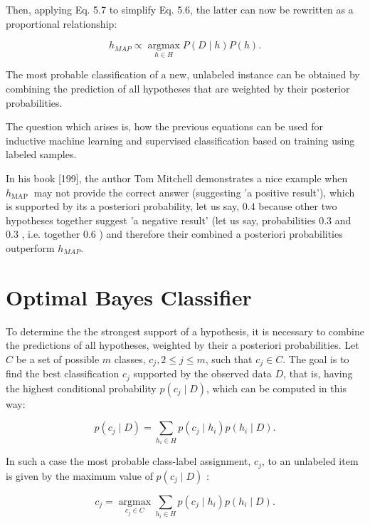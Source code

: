\documentclass[11pt,openany,executivepaper]{book}
\begin{document}
Then, applying Eq. 5.7 to simplify Eq. 5.6, the latter can now be rewritten as a proportional relationship:


\begin{equation*}
h_{M A P} \propto \underset{h \in H}{\operatorname{argmax}} P(D \mid h) P(h) . \tag{5.8}
\end{equation*}


The most probable classification of a new, unlabeled instance can be obtained by combining the prediction of all hypotheses that are weighted by their posterior probabilities.

The question which arises is, how the previous equations can be used for inductive machine learning and supervised classification based on training using labeled samples.

In his book [199], the author Tom Mitchell demonstrates a nice example when $h_{\text {MAP }}$ may not provide the correct answer (suggesting 'a positive result'), which is supported by its a posteriori probability, let us say, 0.4 because other two hypotheses together suggest 'a negative result' (let us say, probabilities 0.3 and 0.3 , i.e. together 0.6 ) and therefore their combined a posteriori probabilities outperform $h_{M A P}$.

\section{Optimal Bayes Classifier}
To determine the the strongest support of a hypothesis, it is necessary to combine the predictions of all hypotheses, weighted by their a posteriori probabilities. Let $C$ be a set of possible $m$ classes, $c_{j}, 2 \leq j \leq m$, such that $c_{j} \in C$. The goal is to find the best classification $c_{j}$ supported by the observed data $D$, that is, having the highest conditional probability $p\left(c_{j} \mid D\right)$, which can be computed in this way:


\begin{equation*}
p\left(c_{j} \mid D\right)=\sum_{h_{i} \in H} p\left(c_{j} \mid h_{i}\right) p\left(h_{i} \mid D\right) . \tag{5.9}
\end{equation*}


In such a case the most probable class-label assignment, $c_{j}$, to an unlabeled item is given by the maximum value of $p\left(c_{j} \mid D\right)$ :


\begin{equation*}
c_{j}=\underset{c_{j} \in C}{\operatorname{argmax}} \sum_{h_{i} \in H} p\left(c_{j} \mid h_{i}\right) p\left(h_{i} \mid D\right) . \tag{5.10}
\end{equation*}
\end{document}
